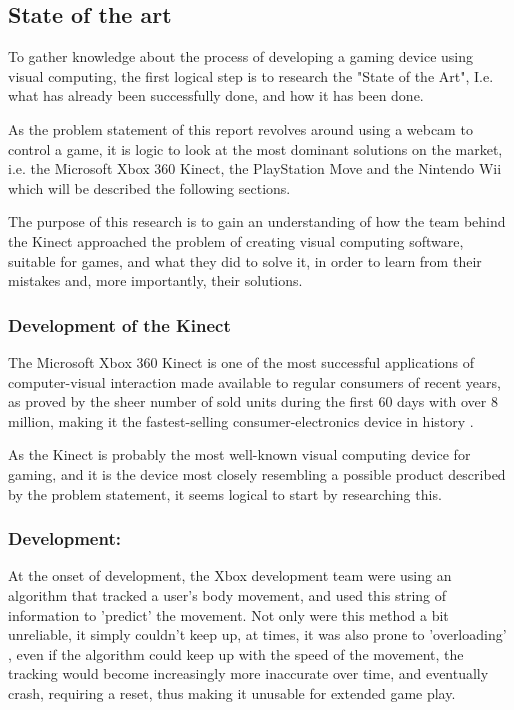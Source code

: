 \subsection{State of the art}
To gather knowledge about the process of developing a gaming device using visual computing, the first logical step is to research the "State of the Art", I.e. what has already been successfully done, and how it has been done.

As the problem statement of this report revolves around using a webcam to control a game, it is logic to look at the most dominant solutions on the market, i.e. the Microsoft Xbox 360 Kinect, the PlayStation Move and the Nintendo Wii which will be described the following sections.

The purpose of this research is to gain an understanding of how the team behind the Kinect approached the problem of creating visual computing software, suitable for games, and what they did to solve it, in order to learn from their mistakes and, more importantly, their solutions.

\subsubsection{Development of the Kinect}
The Microsoft Xbox 360 Kinect is one of the most successful applications of computer-visual interaction made available to regular consumers of recent years, as proved by the sheer number of sold units during the first 60 days with over 8 million, making it the fastest-selling consumer-electronics device in history \parencite{Knies}.

As the Kinect is probably the most well-known visual computing device for gaming, and it is the device most closely resembling a possible product described by the problem statement, it seems logical to start by researching this.

\subsubsection*{Development:}
At the onset of development, the Xbox development team were using an algorithm that tracked a user's body movement, and used this string of information to 'predict' the movement. Not only were this method a bit unreliable, it simply couldn't keep up, at times, it was also prone to 'overloading' \parencite{Knies}, even if the algorithm could keep up with the speed of the movement, the tracking would become increasingly more inaccurate over time, and eventually crash, requiring a reset, thus making it unusable for extended game play.

